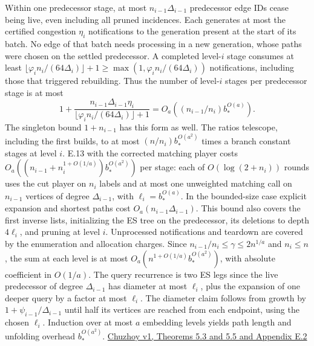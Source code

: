 \documentclass[11pt]{article}
\begin{document}
\begin{itemize}
  Within one predecessor stage, at most \(n_{i-1}\Delta_{i-1}\) predecessor edge IDs cease being live, even including all pruned incidences. Each generates at most the certified congestion \(\eta_i\) notifications to the generation present at the start of its batch. No edge of that batch needs processing in a new generation, whose paths were chosen on the settled predecessor. A completed level-\(i\) stage consumes at least \(\lfloor\varphi_i n_i/(64\Delta_i)\rfloor+1\ge\max(1,\varphi_i n_i/(64\Delta_i))\) notifications, including those that triggered rebuilding. Thus the number of level-\(i\) stages per predecessor stage is at most
  \[
     1+\frac{n_{i-1}\Delta_{i-1}\eta_i}
                  {\lfloor\varphi_i n_i/(64\Delta_i)\rfloor+1}
     =O_a((n_{i-1}/n_i)b_*^{O(a)}).
  \]
  The singleton bound \(1+n_{i-1}\) has this form as well. The ratios telescope, including the first builds, to at most \((n/n_i)b_*^{O(a^2)}\) times a branch constant stages at level \(i\). E.13 with the corrected matching player costs \(O_a((n_{i-1}+n_i^{1+O(1/a)})b_*^{O(a^2)})\) per stage: each of \(O(\log(2+n_i))\) rounds uses the cut player on \(n_i\) labels and at most one unweighted matching call on \(n_{i-1}\) vertices of degree \(\Delta_{i-1}\), with \(\ell_i=b_*^{O(a)}\). In the bounded-size case explicit expansion and shortest paths cost \(O_a(n_{i-1}\Delta_{i-1})\). This bound also covers the first inverse lists, initializing the ES tree on the predecessor, its deletions to depth \(4\ell_i\), and pruning at level \(i\). Unprocessed notifications and teardown are covered by the enumeration and allocation charges. Since \(n_{i-1}/n_i\le\gamma\le2n^{1/a}\) and \(n_i\le n\), the sum at each level is at most \(O_a(n^{1+O(1/a)} b_*^{O(a^2)})\), with absolute coefficient in \(O(1/a)\). The query recurrence is two ES legs since the live predecessor of degree \(\Delta_{i-1}\) has diameter at most \(\ell_i\), plus the expansion of one deeper query by a factor at most \(\ell_i\). The diameter claim follows from growth by \(1+\psi_{i-1}/\Delta_{i-1}\) until half its vertices are reached from each endpoint, using the chosen \(\ell_i\). Induction over at most \(a\) embedding levels yields path length and unfolding overhead \(b_*^{O(a^2)}\). \href{https://arxiv.org/pdf/2109.05621v1}{Chuzhoy v1, Theorems 5.3 and 5.5 and Appendix E.2}
\end{itemize}
\end{document}

